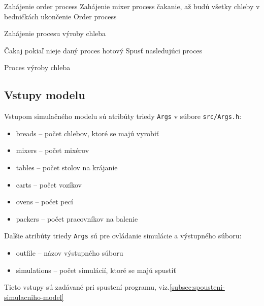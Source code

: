 \documentclass[a4paper, 10pt]{article}
\begin{document}
    \begin{algorithm}[ht]

        Zahájenie order process\;
        {
            Zahájenie mixer process\;
        }
        čakanie, až budú všetky chleby v bedničkách\;
        ukončenie Order process\;

        \caption{Zahájenie procesu výroby chleba}
        \label{algorithm:orderprocess}
    \end{algorithm}

    \begin{algorithm}[ht]
        Čakaj pokiaľ nieje daný proces hotový\;
        Spusť nasledujúci proces\;
        \caption{Proces výroby chleba}
        \label{algorithm:otherprocess}
    \end{algorithm}

    \subsection{Vstupy modelu}
    Vstupom simulačného modelu sú atribúty triedy \texttt{Args} v súbore \texttt{src/Args.h}:
    \begin{itemize}
        \item breads -- počet chlebov, ktoré se majú vyrobiť
        \item mixers -- počet mixérov
        \item tables -- počet stolov na krájanie
        \item carts -- počet vozíkov
        \item ovens -- počet pecí
        \item packers -- počet pracovníkov na balenie
    \end{itemize}

    Dalšie atribúty triedy \texttt{Args} sú pre ovládanie simulácie a výstupného súboru:
    \begin{itemize}
        \item outfile -- názov výstupného súboru
        \item simulations -- počet simulácií, ktoré se majú spustiť
    \end{itemize}

    Tieto vstupy sú zadávané pri spustení programu, viz.\ref{subsec:spousteni-simulacniho-model}
\end{document}

